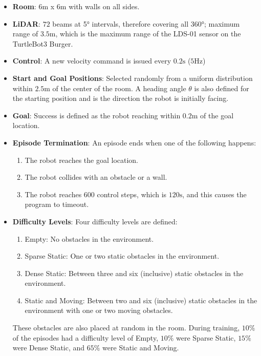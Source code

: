 \documentclass[conference, 11pt]{IEEEtran}
\begin{document}
    \begin{itemize}
        \item \textbf{Room}: $6 \mathrm{m}$ x $6 \mathrm{m}$ with walls on all sides.
    
        \item \textbf{LiDAR}: $72$ beams at \ang{5} intervals, therefore covering all \ang{360}; maximum range of $3.5 \mathrm{m}$, which is the maximum range of the LDS-01 sensor on the TurtleBot3 Burger.

        \item \textbf{Control}: A new velocity command is issued every $0.2 \mathrm{s}$ ($5 \mathrm{Hz}$)
    
        \item \textbf{Start and Goal Positions}: Selected randomly from a uniform distribution within $2.5 \mathrm{m}$ of the center of the room. A heading angle $\theta$ is also defined for the starting position and is the direction the robot is initially facing.
    
        \item \textbf{Goal}: Success is defined as the robot reaching within $0.2 \mathrm{m}$ of the goal location.

        \item \textbf{Episode Termination}: An episode ends when one of the following happens:
            \begin{enumerate}
                \item The robot reaches the goal location.
    
                \item The robot collides with an obstacle or a wall.
    
                \item The robot reaches $600$ control steps, which is $120 \mathrm{s}$, and this causes the program to timeout.
            \end{enumerate}
    
        \item \textbf{Difficulty Levels}: Four difficulty levels are defined:
            \begin{enumerate}
                \item Empty: No obstacles in the environment.
                \item Sparse Static: One or two static obstacles in the environment.
                \item Dense Static: Between three and six (inclusive) static obstacles in the environment.
                \item Static and Moving: Between two and six (inclusive) static obstacles in the environment with one or two moving obstacles.
            \end{enumerate}
            These obstacles are also placed at random in the room. During training, $10\%$ of the episodes had a difficulty level of Empty, $10\%$ were Sparse Static, $15\%$ were Dense Static, and $65\%$ were Static and Moving.
    

\end{itemize}
\end{document}
